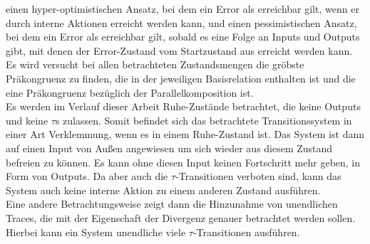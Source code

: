einen hyper-optimistischen Ansatz, bei dem ein Error als erreichbar gilt, wenn
er durch interne Aktionen erreicht werden kann, und einen pessimistischen
Ansatz, bei dem ein Error als erreichbar gilt, sobald es eine Folge an Inputs
und Outputs gibt, mit denen der Error-Zustand vom Startzustand aus erreicht
werden kann.\\
Es wird versucht bei allen betrachteten Zustandsmengen die gröbste Präkongruenz zu
finden, die in der jeweiligen Basisrelation enthalten ist und die eine
Präkongruenz bezüglich der Parallelkomposition ist.\\
Es werden im Verlauf dieser Arbeit Ruhe-Zustände betrachtet, die keine Outputs
und keine $\tau$s zulassen. Somit befindet sich das betrachtete
Transitionssystem in einer Art Verklemmung, wenn es in einem Ruhe-Zustand ist.
Das System ist dann auf einen Input von Außen angewiesen um sich wieder aus
diesem Zustand befreien zu können. Es kann ohne diesen Input keinen Fortschritt
mehr geben, in Form von Outputs. Da aber auch die $\tau$-Transitionen verboten
sind, kann das System auch keine interne Aktion zu einem anderen Zustand
ausführen.\\
Eine andere Betrachtungsweise zeigt dann die Hinzunahme von unendlichen Traces,
die mit der Eigenschaft der Divergenz genauer betrachtet werden sollen. Hierbei
kann ein System unendliche viele $\tau$-Transitionen ausführen.
